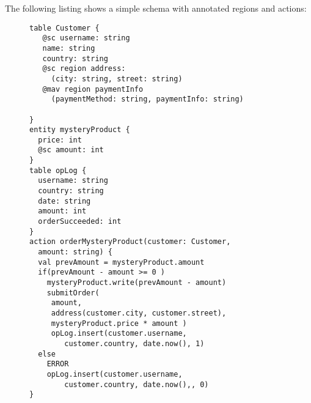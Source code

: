 \documentclass[preprint, numbers]{sigplanconf}
\begin{document}
The following listing shows a simple schema with annotated regions and actions:
\begin{figure}[t!] 
\begin{lstlisting}[basicstyle=\small]
table Customer {
   @sc username: string
   name: string 
   country: string
   @sc region address: 
     (city: string, street: string)
   @mav region paymentInfo 
     (paymentMethod: string, paymentInfo: string)

}
entity mysteryProduct {
  price: int
  @sc amount: int
}
table opLog {
  username: string
  country: string
  date: string
  amount: int
  orderSucceeded: int
}
action orderMysteryProduct(customer: Customer,
  amount: string) {
  val prevAmount = mysteryProduct.amount
  if(prevAmount - amount >= 0 )
    mysteryProduct.write(prevAmount - amount)
    submitOrder(
     amount, 
     address(customer.city, customer.street), 
     mysteryProduct.price * amount )
     opLog.insert(customer.username, 
        customer.country, date.now(), 1)
  else 
    ERROR
    opLog.insert(customer.username, 
        customer.country, date.now(),, 0)
}
\end{lstlisting}
\end{figure}
\end{document}
